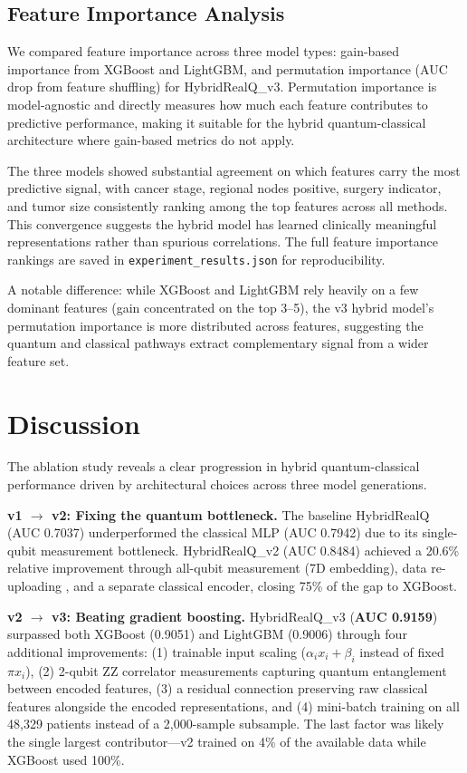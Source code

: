 \documentclass[12pt, letterpaper]{article}
\begin{document}
\subsection{Feature Importance Analysis}
We compared feature importance across three model types: gain-based importance from XGBoost and LightGBM, and permutation importance (AUC drop from feature shuffling) for HybridRealQ\_v3. Permutation importance is model-agnostic and directly measures how much each feature contributes to predictive performance, making it suitable for the hybrid quantum-classical architecture where gain-based metrics do not apply.

The three models showed substantial agreement on which features carry the most predictive signal, with cancer stage, regional nodes positive, surgery indicator, and tumor size consistently ranking among the top features across all methods. This convergence suggests the hybrid model has learned clinically meaningful representations rather than spurious correlations. The full feature importance rankings are saved in \texttt{experiment\_results.json} for reproducibility.

A notable difference: while XGBoost and LightGBM rely heavily on a few dominant features (gain concentrated on the top 3--5), the v3 hybrid model's permutation importance is more distributed across features, suggesting the quantum and classical pathways extract complementary signal from a wider feature set.


\section{Discussion}

The ablation study reveals a clear progression in hybrid quantum-classical performance driven by architectural choices across three model generations.

\textbf{v1 $\to$ v2: Fixing the quantum bottleneck.} The baseline HybridRealQ (AUC 0.7037) underperformed the classical MLP (AUC 0.7942) due to its single-qubit measurement bottleneck. HybridRealQ\_v2 (AUC 0.8484) achieved a 20.6\% relative improvement through all-qubit measurement (7D embedding), data re-uploading \citep{perez2020}, and a separate classical encoder, closing 75\% of the gap to XGBoost.

\textbf{v2 $\to$ v3: Beating gradient boosting.} HybridRealQ\_v3 (\textbf{AUC 0.9159}) surpassed both XGBoost (0.9051) and LightGBM (0.9006) through four additional improvements: (1) trainable input scaling ($\alpha_i x_i + \beta_i$ instead of fixed $\pi x_i$), (2) 2-qubit ZZ correlator measurements capturing quantum entanglement between encoded features, (3) a residual connection preserving raw classical features alongside the encoded representations, and (4) mini-batch training on all 48{,}329 patients instead of a 2{,}000-sample subsample. The last factor was likely the single largest contributor---v2 trained on 4\% of the available data while XGBoost used 100\%.
\end{document}
